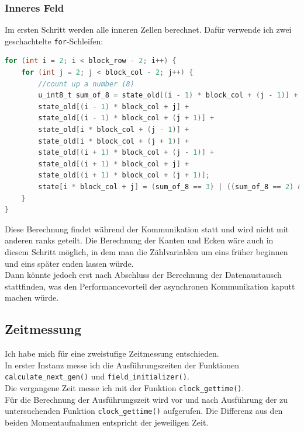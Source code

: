 \documentclass[german,plainarticle,hyperref,utf8]{zihpub}
\begin{document}
	\subsubsection{Inneres Feld}
	Im ersten Schritt werden alle inneren Zellen berechnet. Dafür verwende ich zwei geschachtelte \texttt{for}-Schleifen:\\
	\begin{lstlisting}[language=C, caption=Berechnung der inneren Zellen]
for (int i = 2; i < block_row - 2; i++) {
	for (int j = 2; j < block_col - 2; j++) {
		//count up a number (8)
		u_int8_t sum_of_8 = state_old[(i - 1) * block_col + (j - 1)] +
		state_old[(i - 1) * block_col + j] +
		state_old[(i - 1) * block_col + (j + 1)] +
		state_old[i * block_col + (j - 1)] +
		state_old[i * block_col + (j + 1)] +
		state_old[(i + 1) * block_col + (j - 1)] +
		state_old[(i + 1) * block_col + j] +
		state_old[(i + 1) * block_col + (j + 1)];
		state[i * block_col + j] = (sum_of_8 == 3) | ((sum_of_8 == 2) & state_old[i * block_col + j]);
	}
}\end{lstlisting}

	Diese Berechnung findet während der Kommunikation statt und wird nicht mit anderen ranks geteilt. Die Berechnung der Kanten und Ecken wäre auch in diesem Schritt möglich, in dem man die Zählvariablen um eins früher beginnen und eins später enden lassen würde.\\
	Dann könnte jedoch erst nach Abschluss der Berechnung der Datenaustausch stattfinden, was den Performancevorteil der asynchronen Kommunikation kaputt machen würde.

	\subsection{Zeitmessung}
	Ich habe mich für eine zweistufige Zeitmessung entschieden.\\
	
	In erster Instanz messe ich die Ausführungszeiten der Funktionen \texttt{calculate\_next\_gen()} und \texttt{field\_initializer()}.\\
	Die vergangene Zeit messe ich mit der Funktion \texttt{clock\_gettime()}.\\
	Für die Berechnung der Ausführungszeit wird vor und nach Ausführung der zu untersuchenden Funktion \texttt{clock\_gettime()} aufgerufen. Die Differenz aus den beiden Momentaufnahmen entspricht der jeweiligen Zeit.\\
	
\end{document}
